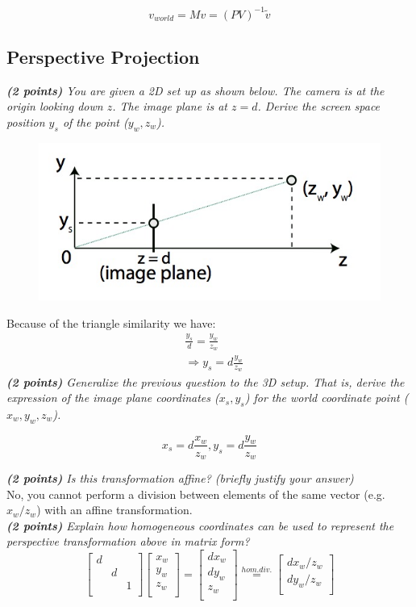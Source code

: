 \documentclass[a4paper,10pt]{article}
\begin{document}
\[v_{world}=Mv=(PV)^{-1}\tilde{v}\]

\subsection{Perspective Projection}
\textit{\textbf{(2 points)} You are given a 2D set up as shown below. The camera is at the origin looking down $z$. The image plane is at $z = d$. Derive the screen space position $y_s$ of
the point ($y_w,z_w$).}\\

\begin{figure}[H]
	\centering
	\includegraphics[width=.3\textwidth]{2-perspective}
\end{figure}
Because of the triangle similarity we have:
\[\begin{aligned}
&\frac{y_s}{d}=\frac{y_w}{z_w}\\
&\Rightarrow y_s=d\frac{y_w}{z_w}
\end{aligned}\]
\textit{\textbf{(2 points)} Generalize the previous question to the 3D setup. That is, derive the expression of the image plane coordinates ($x_s,y_s$) for the world coordinate point
($x_w,y_w,z_w$).}

\[x_s=d\frac{x_w}{z_w}, y_s=d\frac{y_w}{z_w}\]

\textit{\textbf{(2 points)} Is this transformation affine? (briefly justify your answer)}\\

No, you cannot  perform a division between elements of the same vector (e.g. $x_w/z_w$) with an affine transformation.\\

\textit{\textbf{(2 points)} Explain how homogeneous coordinates can be used to represent the perspective transformation above in matrix form?}\\

\[\begin{bmatrix}
d&&\\
&d&\\
&&1\\
\end{bmatrix}
\begin{bmatrix}
x_w\\
y_w\\
z_w\\
\end{bmatrix}=
\begin{bmatrix}
dx_w\\
dy_w\\
z_w\\
\end{bmatrix}\overset{hom.div.}{=}
\begin{bmatrix}
dx_w/z_w\\
dy_w/z_w\\
\end{bmatrix}\]
\end{document}
